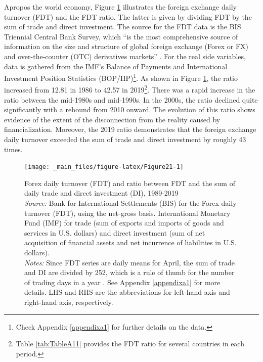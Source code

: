 \documentclass[a4paper, twoside]{templates/ociamthesis}
\begin{document}
Apropos the world economy, Figure \ref{fig:Figure21} illustrates the foreign exchange daily turnover (FDT) and the FDT ratio. The latter is given by dividing FDT by the sum of trade and direct investment. The source for the FDT data is the BIS Triennial Central Bank Survey, which ``is the most comprehensive source of information on the size and structure of global foreign exchange (Forex or FX) and over-the-counter (OTC) derivatives markets'' \autocite[ 3]{bankforinternationalsettlements2019}. For the real side variables, data is gathered from the IMF's Balance of Payments and International Investment Position Statistics (BOP/IIP)\footnote{Check Appendix \ref{appendixa1} for further details on the data.}. As shown in Figure \ref{fig:Figure21}, the ratio increased from 12.81 in 1986 to 42.57 in 2019\footnote{Table \ref{tab:TableA11} provides the FDT ratio for several countries in each period.}. There was a rapid increase in the ratio between the mid-1980s and mid-1990s. In the 2000s, the ratio declined quite significantly with a rebound from 2010 onward. The evolution of this ratio shows evidence of the extent of the disconnection from the reality caused by financialization. Moreover, the 2019 ratio demonstrates that the foreign exchange daily turnover exceeded the sum of trade and direct investment by roughly 43 times.




\begin{figure}[!ht]

{\centering \texttt{[image: \_main\_files/figure-latex/Figure21-1]} 

}

\caption[Forex daily turnover (FDT) and ratio between FDT and the sum of daily trade and direct investment (DI), 1989-2019]{Forex daily turnover (FDT) and ratio between FDT and the sum of daily trade and direct investment (DI), 1989-2019 \\ \scriptsize \textit{Source:} Bank for International Settlements (BIS) for the Forex daily turnover (FDT), using the net-gross basis. International Monetary Fund (IMF) for trade (sum of exports and imports of goods and services in U.S. dollars) and direct investment (sum of net acquisition of financial assets and net incurrence of liabilities in U.S. dollars). \\ \scriptsize \textit{Notes:} Since FDT series are daily means for April, the sum of trade and DI are divided by 252, which is a rule of thumb for the number of trading days in a year \autocite{newyorkstockexchange2021}. See Appendix \ref{appendixa1} for more details. LHS and RHS are the abbreviations for left-hand axis and right-hand axis, respectively.}\label{fig:Figure21}
\end{figure}
\end{document}

